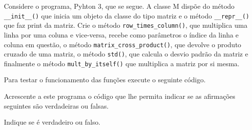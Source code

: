 \documentclass[12pt,varwidth=16cm,border=1pt]{standalone}
\begin{document}
	
Considere o programa, Pyhton 3, que se segue. A classe M dispõe do método \verb+__init__()+ que inicia um objeto da classe do tipo matriz e o método \verb+__repr__()+ que faz print da matriz. Crie o método \verb+row_times_column()+, que multiplica uma linha por uma coluna e vice-versa, recebe como parâmetros o índice da linha e coluna em questão, o método \verb+matrix_cross_product()+, que devolve o produto cruzado de uma matriz, o método \verb+std()+, que calcula o desvio padrão da matriz e finalmente o método \verb+mult_by_itself()+ que multiplica a matriz por si mesma.



Para testar o funcionamento das funções execute o seguinte código.



Acrescente a este programa o código que lhe permita indicar se as
afirmações seguintes são verdadeiras ou falsas.

Indique se é verdadeiro ou falso.
	
\end{document}
